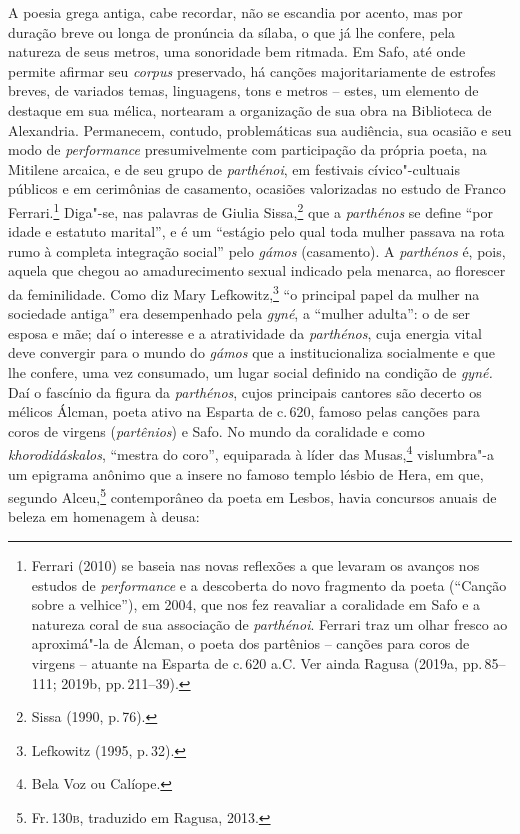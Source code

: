  A poesia grega antiga, cabe recordar, não se
escandia por acento, mas por duração breve ou longa de pronúncia da sílaba, o
que já lhe confere, pela natureza de seus metros, uma sonoridade bem ritmada. Em Safo, até onde permite afirmar seu \textit{corpus} preservado,
há canções majoritariamente de estrofes breves, de variados temas,
linguagens, tons e metros -- estes, um elemento de destaque em sua mélica, nortearam a organização de sua obra na Biblioteca de Alexandria.
Permanecem, contudo, problemáticas
sua audiência, sua ocasião e seu modo de \textit{performance} presumivelmente com participação da própria poeta, na Mitilene arcaica, e de seu grupo de \textit{parthénoi}, em festivais cívico"-cultuais públicos e em cerimônias de casamento, ocasiões valorizadas no estudo de Franco Ferrari.\footnote{Ferrari (2010) se baseia nas novas reflexões a que levaram os avanços nos estudos de \textit{performance} e a descoberta do novo fragmento da poeta (``Canção sobre a velhice''), em 2004, que nos fez reavaliar a coralidade em Safo e a natureza coral de sua associação de \textit{parthénoi}. Ferrari traz um olhar fresco ao aproximá"-la de Álcman, o poeta dos partênios -- canções para coros de virgens -- atuante na Esparta de c.\,620 a.C. Ver ainda Ragusa (2019a, pp.\,85--111; 2019b, pp.\,211--39).}
Diga"-se, nas palavras de Giulia Sissa,\footnote{Sissa (1990, p.\,76).} que a \textit{parthénos} se define “por idade e estatuto marital”, e é um “estágio pelo qual toda mulher passava na rota rumo à completa integração social” pelo \textit{gámos} (casamento). A \textit{parthénos} é, pois, aquela que chegou ao amadurecimento sexual indicado pela menarca, ao florescer da feminilidade. Como diz Mary Lefkowitz,\footnote{Lefkowitz (1995, p.\,32).} “o principal papel da mulher na sociedade antiga” era desempenhado pela \textit{gyné}, a ``mulher adulta'': o de ser esposa e mãe; daí o interesse e a atratividade da \textit{parthénos}, cuja energia vital deve convergir para o mundo do \textit{gámos} que a institucionaliza socialmente e que lhe confere, uma vez consumado, um lugar social definido na condição de \textit{gyné.} Daí o fascínio da figura da \textit{parthénos}, cujos principais cantores são decerto os mélicos Álcman, poeta ativo na Esparta de c.\,620, famoso pelas canções para coros de virgens (\textit{partênios}) e Safo.
No mundo da coralidade e como \textit{khorodidáskalos}, ``mestra do coro'', equiparada à líder das Musas,\footnote{Bela Voz ou Calíope.} vislumbra"-a um epigrama anônimo que a insere no famoso templo lésbio de Hera, em que, segundo Alceu,\footnote{Fr.\,130\textsc{b}, traduzido em Ragusa, 2013.} contemporâneo da poeta em Lesbos, havia concursos anuais de beleza em homenagem à deusa:

